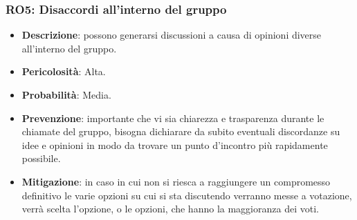 \subsubsection{RO5: Disaccordi all'interno del gruppo}
\begin{itemize}
    \item \textbf{Descrizione}: possono generarsi discussioni a causa di opinioni diverse all'interno del gruppo.
    \item \textbf{Pericolosità}: Alta.
    \item \textbf{Probabilità}: Media.
    \item \textbf{Prevenzione}: importante che vi sia chiarezza e trasparenza durante le chiamate del gruppo, bisogna dichiarare da subito eventuali discordanze su idee e opinioni in modo da trovare un punto d'incontro più rapidamente possibile.
    \item \textbf{Mitigazione}: in caso in cui non si riesca a raggiungere un compromesso definitivo le varie opzioni su cui si sta discutendo verranno messe a votazione, verrà scelta l'opzione, o le opzioni, che hanno la maggioranza dei voti. 
\end{itemize}

